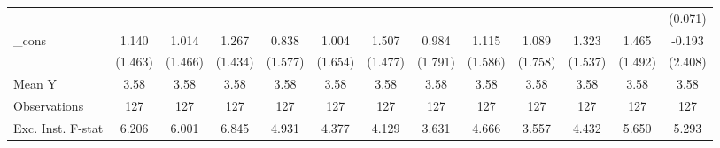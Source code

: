 {\begin{tabular}{l*{12}{c}}
            &                     &                     &                     &                     &                     &                     &                     &                     &                     &                     &                     &     (0.071)         \\
\addlinespace
\_cons      &       1.140         &       1.014         &       1.267         &       0.838         &       1.004         &       1.507         &       0.984         &       1.115         &       1.089         &       1.323         &       1.465         &      -0.193         \\
            &     (1.463)         &     (1.466)         &     (1.434)         &     (1.577)         &     (1.654)         &     (1.477)         &     (1.791)         &     (1.586)         &     (1.758)         &     (1.537)         &     (1.492)         &     (2.408)         \\
\midrule
Mean Y      &        3.58         &        3.58         &        3.58         &        3.58         &        3.58         &        3.58         &        3.58         &        3.58         &        3.58         &        3.58         &        3.58         &        3.58         \\
Observations&         127         &         127         &         127         &         127         &         127         &         127         &         127         &         127         &         127         &         127         &         127         &         127         \\
Exc. Inst. F-stat&       6.206         &       6.001         &       6.845         &       4.931         &       4.377         &       4.129         &       3.631         &       4.666         &       3.557         &       4.432         &       5.650         &       5.293         \\
\bottomrule
\end{tabular}
}
